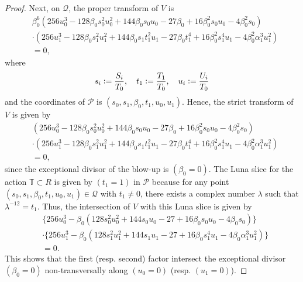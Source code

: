 \documentclass[12pt, pdftex]{amsart}
\theoremstyle{plain}
\theoremstyle{definition}
\numberwithin{equation}{section}
\def\PP{\mathcal{P}}
\def\QQ{\mathcal{Q}}
\def\a{\alpha}
\def\b{\beta}
\newcommand{\defeq}{\vcentcolon=}
\begin{document}
\begin{proof}
Next, on $\QQ$, the proper transform of $V$ is 
\begin{align*}
    &\b_0^6(256u_0^3-128\b_0s_0^2u_0^2+144\b_0s_0u_0-27\b_0+16\b_0^2s_0u_0-4\b_0^2s_0)\\
    &\cdot(256u_1^3-128\b_0s_1^2u_1^2+144\b_0s_1t_1^2u_1-27\b_0t_1^4+16\b_0^2s_1^4u_1-4\b_0^2\a_1^3u_1^2)\\
    &=0,
\end{align*}
where
\[s_i\defeq\frac{S_i}{T_0},\quad t_1\defeq\frac{T_1}{T_0},\quad u_i\defeq\frac{U_i}{T_0}\]
and the coordinates of $\PP$ is $(s_0,s_1,\b_0,t_1,u_0,u_1)$.
Hence, the strict transform of $V$ is given by 
\begin{align*}
    &(256u_0^3-128\b_0s_0^2u_0^2+144\b_0s_0u_0-27\b_0+16\b_0^2s_0u_0-4\b_0^2s_0)\\
    &\cdot(256u_1^3-128\b_0s_1^2u_1^2+144\b_0s_1t_1^2u_1-27\b_0t_1^4+16\b_0^2s_1^4u_1-4\b_0^2\a_1^3u_1^2)\\
    &=0,
\end{align*}
since the exceptional divisor of the blow-up is $(\b_0=0)$.
The Luna slice for the action $\mathbb{T}\subset R$ is given by $(t_1=1)$ in $\PP$ because for any point $(s_0,s_1,\b_0,t_1,u_0,u_1)\in\QQ$ with $t_1\neq 0$, there exists a complex number $\lambda$ such that $\lambda^{-12}=t_1$.
Thus, the intersection of $V$ with this Luna slice is given by 
\begin{align*}
    &\{256u_0^3-\b_0(128s_0^2u_0^2+144s_0u_0-27+16\b_0s_0u_0-4\b_0s_0)\}\\
    &\cdot\{256u_1^3-\b_0(128s_1^2u_1^2+144s_1u_1-27+16\b_0s_1^4u_1-4\b_0\a_1^3u_1^2)\}\\
    &=0.
\end{align*}
This shows that the first (resp. second) factor intersect the exceptional divisor $(\b_0=0)$ non-transversally along $(u_0=0)$ (resp. $(u_1=0)$).


\end{proof}
\end{document}
